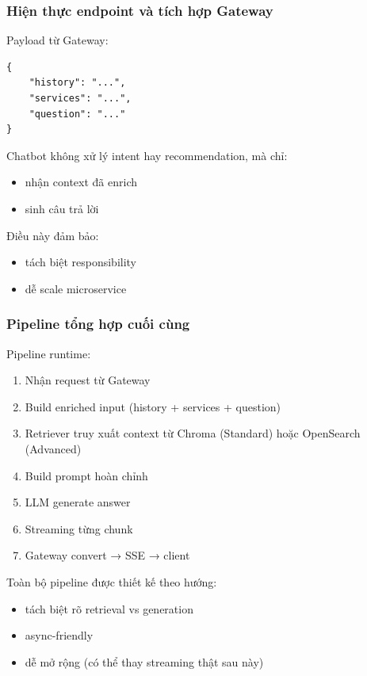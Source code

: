 \subsubsection{Hiện thực endpoint và tích hợp Gateway}

Payload từ Gateway:

\begin{verbatim}
{
    "history": "...",
    "services": "...",
    "question": "..."
}
\end{verbatim}

Chatbot không xử lý intent hay recommendation, mà chỉ:

\begin{itemize}
    \item nhận context đã enrich
    \item sinh câu trả lời
\end{itemize}

Điều này đảm bảo:
\begin{itemize}
    \item tách biệt responsibility
    \item dễ scale microservice
\end{itemize}

\subsubsection{Pipeline tổng hợp cuối cùng}

Pipeline runtime:

\begin{enumerate}
    \item Nhận request từ Gateway
    \item Build enriched input (history + services + question)
    \item Retriever truy xuất context từ Chroma (Standard) hoặc OpenSearch (Advanced)
    \item Build prompt hoàn chỉnh
    \item LLM generate answer
    \item Streaming từng chunk
    \item Gateway convert → SSE → client
\end{enumerate}

Toàn bộ pipeline được thiết kế theo hướng:
\begin{itemize}
    \item tách biệt rõ retrieval vs generation
    \item async-friendly
    \item dễ mở rộng (có thể thay streaming thật sau này)
\end{itemize}



